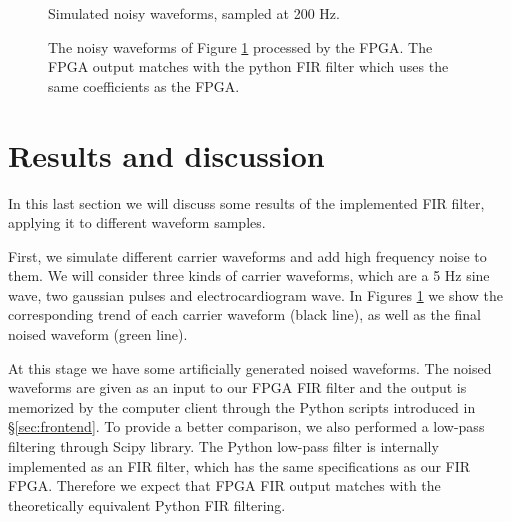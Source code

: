 \begin{figure}[hbt]
    \centering
    \caption{Simulated noisy waveforms, sampled at 200 Hz.}
    \label{fig:sample_general}
    
    
    
    \qquad
\end{figure}


\begin{figure}[hbt]
    \centering
    \caption{ The noisy waveforms of Figure \ref{fig:sample_general} processed by the FPGA. The FPGA output matches with the python FIR filter which uses the same coefficients as the FPGA.}
    \label{fig:real_general}
    
    
    
    \qquad
\end{figure}



\section{Results and discussion}
\label{sec:results}


In this last section we will discuss some results of the implemented FIR filter, applying it to different waveform samples.

First, we simulate different carrier waveforms and add high frequency noise to them. We will consider three kinds of carrier waveforms, which are a 5 Hz sine wave, two gaussian pulses and electrocardiogram wave. In Figures \ref{fig:sample_general} we show the corresponding trend of each carrier waveform (black line), as well as the final noised waveform (green line).

At this stage we have some artificially generated noised waveforms. The noised waveforms are given as an input to our FPGA FIR filter and the output is memorized by the computer client through the Python scripts introduced in §\ref{sec:frontend}. To provide a better comparison, we also performed a low-pass filtering through Scipy library. The Python low-pass filter is internally implemented as an FIR filter, which has the same specifications as our FIR FPGA. Therefore we expect that FPGA FIR output matches with the theoretically equivalent Python FIR filtering.




